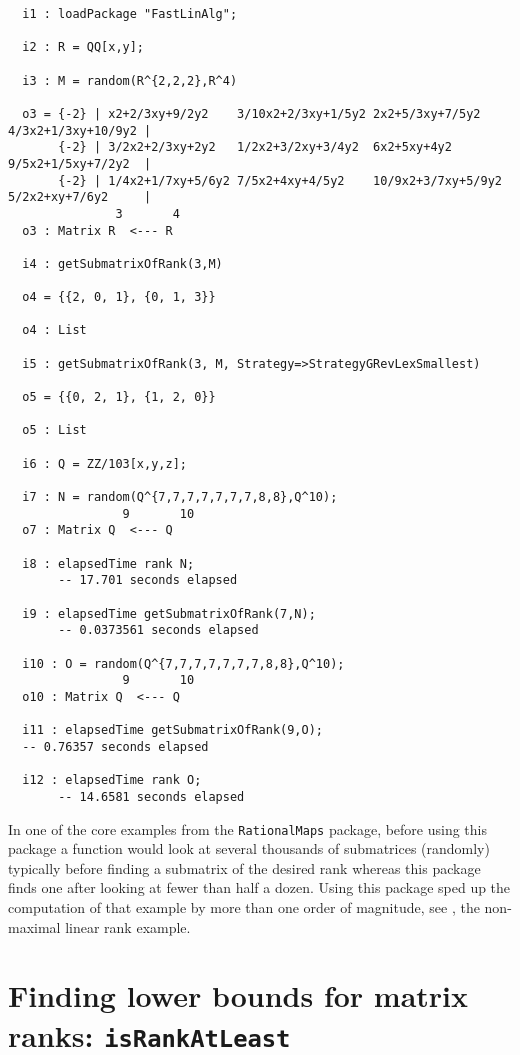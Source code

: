 \documentclass[11pt]{amsart}
\begin{document}
{\small\color{blue}
\begin{verbatim}
  i1 : loadPackage "FastLinAlg";

  i2 : R = QQ[x,y];
  
  i3 : M = random(R^{2,2,2},R^4)
  
  o3 = {-2} | x2+2/3xy+9/2y2    3/10x2+2/3xy+1/5y2 2x2+5/3xy+7/5y2    4/3x2+1/3xy+10/9y2 |
       {-2} | 3/2x2+2/3xy+2y2   1/2x2+3/2xy+3/4y2  6x2+5xy+4y2        9/5x2+1/5xy+7/2y2  |
       {-2} | 1/4x2+1/7xy+5/6y2 7/5x2+4xy+4/5y2    10/9x2+3/7xy+5/9y2 5/2x2+xy+7/6y2     |
               3       4
  o3 : Matrix R  <--- R
  
  i4 : getSubmatrixOfRank(3,M)
  
  o4 = {{2, 0, 1}, {0, 1, 3}}
  
  o4 : List
  
  i5 : getSubmatrixOfRank(3, M, Strategy=>StrategyGRevLexSmallest)
  
  o5 = {{0, 2, 1}, {1, 2, 0}}
  
  o5 : List

  i6 : Q = ZZ/103[x,y,z];
  
  i7 : N = random(Q^{7,7,7,7,7,7,7,8,8},Q^10); 
                9       10
  o7 : Matrix Q  <--- Q
  
  i8 : elapsedTime rank N;
       -- 17.701 seconds elapsed
  
  i9 : elapsedTime getSubmatrixOfRank(7,N);
       -- 0.0373561 seconds elapsed
  
  i10 : O = random(Q^{7,7,7,7,7,7,7,8,8},Q^10);
                9       10
  o10 : Matrix Q  <--- Q
  
  i11 : elapsedTime getSubmatrixOfRank(9,O);
  -- 0.76357 seconds elapsed
  
  i12 : elapsedTime rank O;
       -- 14.6581 seconds elapsed
  \end{verbatim}
}
In one of the core examples from the {\tt RationalMaps} package, before using this package a function would look at several thousands of submatrices (randomly) typically before finding a submatrix of the desired rank whereas this package finds one after looking at fewer than half a dozen.  Using this package sped up the computation of that example by more than one order of magnitude, see 
\cite[Page 7]{BottHassanzadehSchwedeSmolkinRationalMaps}, the non-maximal linear rank example.

\section{Finding lower bounds for matrix ranks: {\tt isRankAtLeast}}
\label{sec.IsRankAtLeast}
\end{document}

